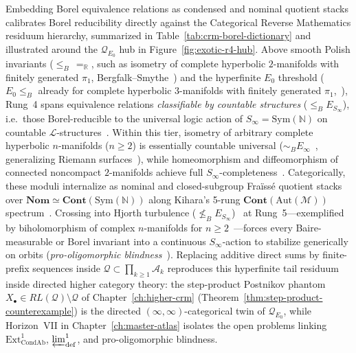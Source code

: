 \documentclass[10pt,twoside,openright]{book}
\theoremstyle{crmplain}
\theoremstyle{crmdef}
\theoremstyle{crmremark}
\begin{document}
Embedding Borel equivalence relations as condensed and nominal quotient stacks calibrates Borel reducibility directly against the Categorical Reverse Mathematics residuum hierarchy, summarized in Table~\ref{tab:crm-borel-dictionary} and illustrated around the $\mathcal{Q}_{E_0}$ hub in Figure~\ref{fig:exotic-r4-hub}. Above smooth Polish invariants ($\le_B\, =_{\mathbb{R}}$, such as isometry of complete hyperbolic $2$-manifolds with finitely generated $\pi_1$, Bergfalk--Smythe~\cite[Theorem~B]{BergfalkSmythe25}) and the hyperfinite $E_0$ threshold ($E_0 \le_B$ already for complete hyperbolic $3$-manifolds with finitely generated $\pi_1$,~\cite[Theorem~C]{BergfalkSmythe25}), Rung~4 spans equivalence relations \emph{classifiable by countable structures} ($\le_B E_{S_\infty}$), i.e.\ those Borel-reducible to the universal logic action of $S_\infty = \mathrm{Sym}(\mathbb{N})$ on countable $\mathcal{L}$-structures~\cite[\S2.7]{BeckerKechris96}. Within this tier, isometry of arbitrary complete hyperbolic $n$-manifolds ($n \ge 2$) is essentially countable universal ($\sim_B E_\infty$~\cite[Theorem~D]{BergfalkSmythe25}, generalizing Riemann surfaces~\cite{HjorthKechris00}), while homeomorphism and diffeomorphism of connected noncompact $2$-manifolds achieve full $S_\infty$-completeness~\cite[Theorem~E]{BergfalkSmythe25}. Categorically, these moduli internalize as nominal and closed-subgroup Fra\"iss\'e quotient stacks over $\mathbf{Nom} \simeq \mathbf{Cont}(\mathrm{Sym}(\mathbb{N}))$ along Kihara's 5-rung $\mathbf{Cont}(\mathrm{Aut}(\mathcal{M}))$ spectrum~\cite{Kihara26}. Crossing into Hjorth turbulence ($\not\le_B E_{S_\infty}$)~\cite[Ch.~3, Theorem~3.21]{Hjorth00} at Rung~5---exemplified by biholomorphism of complex $n$-manifolds for $n \ge 2$~\cite{HjorthKechris00}---forces every Baire-measurable or Borel invariant into a continuous $S_\infty$-action to stabilize generically on orbits (\emph{pro-oligomorphic blindness}~\cite{Hjorth00,Kihara26}). Replacing additive direct sums by finite-prefix sequences inside $\mathcal{Q} \subset \prod_{k \ge 1} \mathcal{A}_k$ reproduces this hyperfinite tail residuum inside directed higher category theory: the step-product Postnikov phantom $X_\bullet \in RL(\mathcal{Q}) \setminus \mathcal{Q}$ of Chapter~\ref{ch:higher-crm} (Theorem~\ref{thm:step-product-counterexample}) is the directed $(\infty,\infty)$-categorical twin of $\mathcal{Q}_{E_0}$, while Horizon~VII in Chapter~\ref{ch:master-atlas} isolates the open problems linking $\mathrm{Ext}^1_{\mathrm{CondAb}}$, $\varprojlim^1_{\mathrm{def}}$, and pro-oligomorphic blindness.
\end{document}
